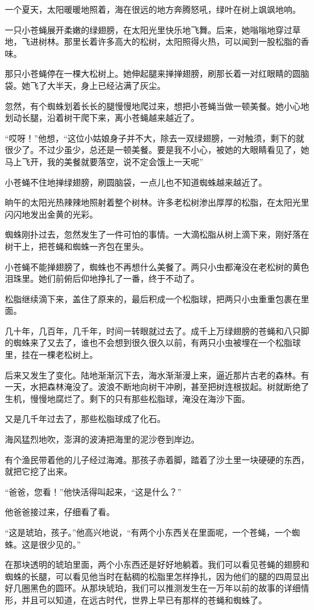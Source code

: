 \documentclass[12pt,UTF8]{ctexbook}
\begin{document}
一个夏天，太阳暖暖地照着，海在很远的地方奔腾怒吼，绿叶在树上飒飒地响。

一只小苍蝇展开柔嫩的绿翅膀，在太阳光里快乐地飞舞。后来，她嗡嗡地穿过草地，飞进树林。那里长着许多高大的松树，太阳照得火热，可以闻到一股松脂的香味。

那只小苍蝇停在一棵大松树上。她伸起腿来掸掸翅膀，刷那长着一对红眼睛的圆脑袋。她飞了大半天，身上已经沾满了灰尘。

忽然，有个蜘蛛划着长长的腿慢慢地爬过来，想把小苍蝇当做一顿美餐。她小心地划动长腿，沿着树干爬下来，离小苍蝇越来越近了。

“哎呀！”他想，“这位小姑娘身子并不大，除去一双绿翅膀，一对触须，剩下的就很少了。不过少虽少，总还是一顿美餐。要是我不小心，被她的大眼睛看见了，她马上飞开，我的美餐就要落空，说不定会饿上一天呢”

小苍蝇不住地掸绿翅膀，刷圆脑袋，一点儿也不知道蜘蛛越来越近了。

晌午的太阳光热辣辣地照射着整个树林。许多老松树渗出厚厚的松脂，在太阳光里闪闪地发出金黄的光彩。

蜘蛛刚扑过去，忽然发生了一件可怕的事情。一大滴松脂从树上滴下来，刚好落在树干上，把苍蝇和蜘蛛一齐包在里头。

小苍蝇不能掸翅膀了，蜘蛛也不再想什么美餐了。两只小虫都淹没在老松树的黄色泪珠里。她们前俯后仰地挣扎了一番，终于不动了。

松脂继续滴下来，盖住了原来的，最后积成一个松脂球，把两只小虫重重包裹在里面。

几十年，几百年，几千年，时间一转眼就过去了。成千上万绿翅膀的苍蝇和八只脚的蜘蛛来了又去了，谁也不会想到很久很久以前，有两只小虫被埋在一个松脂球里，挂在一棵老松树上。

后来又发生了变化。陆地渐渐沉下去，海水渐渐漫上来，逼近那片古老的森林。有一天，水把森林淹没了。波浪不断地向树干冲刷，甚至把树连根拔起。树就断绝了生机，慢慢地腐烂了。剩下的只有那些松脂球，淹没在海沙下面。

又是几千年过去了，那些松脂球成了化石。

海风猛烈地吹，澎湃的波涛把海里的泥沙卷到岸边。

有个渔民带着他的儿子经过海滩。那孩子赤着脚，踏着了沙土里一块硬硬的东西，就把它挖了出来。

“爸爸，您看！”他快活得叫起来，“这是什么？”

他爸爸接过来，仔细看了看。

“这是琥珀，孩子。”他高兴地说，“有两个小东西关在里面呢，一个苍蝇，一个蜘蛛。这是很少见的。”

在那块透明的琥珀里面，两个小东西还是好好地躺着。我们可以看见苍蝇的翅膀和蜘蛛的长腿，可以看见他当时在黏稠的松脂里怎样挣扎，因为他们的腿的四周显出好几圈黑色的圆环。从那块琥珀，我们可以推测发生在一万年以前的故事的详细情形，并且可以知道，在远古时代，世界上早已有那样的苍蝇和蜘蛛了。
\end{document}
